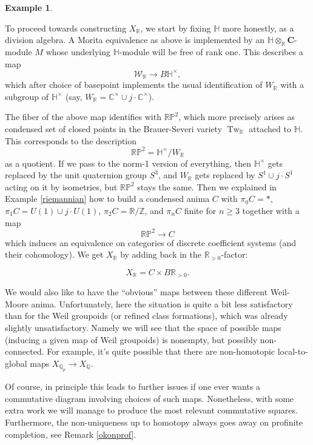 \documentclass[12pt]{article}
\theoremstyle{definition}
\newtheorem{example}[theorem]{Example}
\newcommand{\on}{\operatorname}
\newcommand{\mc}{\mathcal}
\newcommand{\mbb}{\mathbb}
\begin{document}
\begin{example}
\begin{enumerate}
To proceed towards constructing $X_{\mbb{R}}$, we start by fixing $\mbb{H}$ more honestly, as a division algebra.  A Morita equivalence as above is implemented by an $\mbb{H}\otimes_{\mbb{R}}\mathbf{C}$-module $M$ whose underlying $\mbb{H}$-module will be free of rank one.  This describes a map
$$\mc{W}_{\mbb{R}} \to B\mbb{H}^\times,$$
which after choice of basepoint implements the usual identification of $W_{\mbb{R}}$ with a subgroup of $\mbb{H}^\times$ (say, $W_{\mbb{R}}=\mbb{C}^\times\cup j\cdot \mbb{C}^\times$).

The fiber of the above map identifies with $\mbb{R}\mbb{P}^2$, which more precisely arises as condensed set of closed points in the Brauer-Severi variety $\on{Tw}_{\mbb{R}}$ attached to $\mbb{H}$.  This corresponds to the description
$$\mbb{R}\mbb{P}^2 = \mbb{H}^\times/W_\mbb{R}$$
as a quotient.  If we pass to the norm-1 version of everything, then $\mbb{H}^\times$ gets replaced by the unit quaternion group $S^3$, and $W_\mbb{R}$ gets replaced by $S^1\cup j\cdot S^1$ acting on it by isometries, but $\mbb{R}\mbb{P}^2$ stays the same.  Then we explained in Example \ref{riemannian} how to build a condensed anima $C$ with $\pi_0C=\ast$, $\pi_1C = U(1)\cup j\cdot U(1)$, $\pi_2C=\mbb{R}/\mbb{Z}$, and $\pi_nC$ finite for $n\geq 3$ together with a map
$$\mbb{R}\mbb{P}^2 \to C$$
which induces an equivalence on categories of discrete coefficient systems (and their cohomology).  We get $X_\mbb{R}$ by adding back in the $\mbb{R}_{>0}$-factor:

$$X_\mbb{R} = C\times B\mbb{R}_{>0}.$$


\end{enumerate}
\end{example}

We would also like to have the ``obvious'' maps between these different Weil-Moore anima.  Unfortunately, here the situation is quite a bit less satisfactory than for the Weil groupoids (or refined class formations), which was already slightly unsatisfactory.  Namely we will see that the space of possible maps (inducing a given map of Weil groupoids) is nonempty, but possibly non-connected.  For example, it's quite possible that there are non-homotopic local-to-global maps $X_{\mbb{Q}_p} \to X_{\mathbb{Q}}$.

Of course, in principle this leads to further issues if one ever wants a commutative diagram involving choices of such maps.  Nonetheless, with some extra work we will manage to produce the most relevant commutative squares.  Furthermore, the non-uniqueness up to homotopy always goes away on profinite completion, see Remark \ref{okonprof}.
\end{document}
